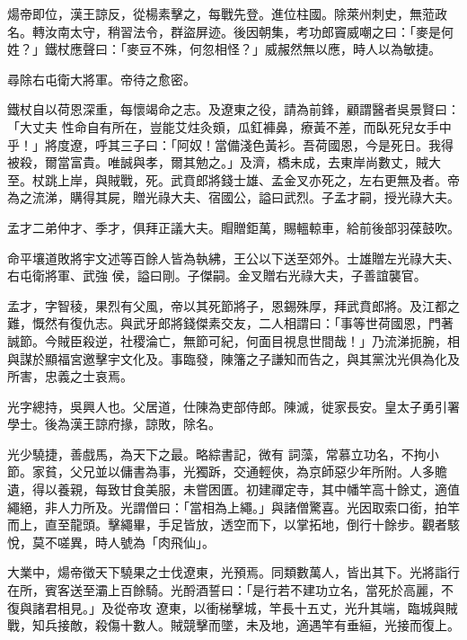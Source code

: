 \begin{pinyinscope}
 煬帝即位，漢王諒反，從楊素擊之，每戰先登。進位柱國。除萊州刺史，無蒞政名。轉汝南太守，稍習法令，群盜屏迹。後因朝集，考功郎竇威嘲之曰：「麥是何姓？」鐵杖應聲曰：「麥豆不殊，何忽相怪？」威赧然無以應，時人以為敏捷。



 尋除右屯衛大將軍。帝待之愈密。



 鐵杖自以荷恩深重，每懷竭命之志。及遼東之役，請為前鋒，顧謂醫者吳景賢曰：「大丈夫
 性命自有所在，豈能艾炷灸頞，瓜釭褲鼻，療黃不差，而臥死兒女手中乎！」將度遼，呼其三子曰：「阿奴！當備淺色黃衫。吾荷國恩，今是死日。我得被殺，爾當富貴。唯誠與孝，爾其勉之。」及濟，橋未成，去東岸尚數丈，賊大至。杖跳上岸，與賊戰，死。武賁郎將錢士雄、孟金叉亦死之，左右更無及者。帝為之流涕，購得其屍，贈光祿大夫、宿國公，謚曰武烈。子孟才嗣，授光祿大夫。



 孟才二弟仲才、季才，俱拜正議大夫。賵贈鉅萬，賜轀輬車，給前後部羽葆鼓吹。



 命平壤道敗將宇文述等百餘人皆為執紼，王公以下送至郊外。士雄贈左光祿大夫、右屯衛將軍、武強
 侯，謚曰剛。子傑嗣。金叉贈右光祿大夫，子善誼襲官。



 孟才，字智稜，果烈有父風，帝以其死節將子，恩錫殊厚，拜武賁郎將。及江都之難，慨然有復仇志。與武牙郎將錢傑素交友，二人相謂曰：「事等世荷國恩，門著誠節。今賊臣殺逆，社稷淪亡，無節可紀，何面目視息世間哉！」乃流涕扼腕，相與謀於顯福宮邀擊宇文化及。事臨發，陳籓之子謙知而告之，與其黨沈光俱為化及所害，忠義之士哀焉。



 光字總持，吳興人也。父居道，仕陳為吏部侍郎。陳滅，徙家長安。皇太子勇引署學士。後為漢王諒府掾，諒敗，除名。



 光少驍捷，善戲馬，為天下之最。略綜書記，微有
 詞藻，常慕立功名，不拘小節。家貧，父兄並以傭書為事，光獨跅，交通輕俠，為京師惡少年所附。人多贍遺，得以養親，每致甘食美服，未嘗困匱。初建禪定寺，其中幡竿高十餘丈，適值繩絕，非人力所及。光謂僧曰：「當相為上繩。」與諸僧驚喜。光因取索口銜，拍竿而上，直至龍頭。擊繩畢，手足皆放，透空而下，以掌拓地，倒行十餘步。觀者駭悅，莫不嗟異，時人號為「肉飛仙」。



 大業中，煬帝徵天下驍果之士伐遼東，光預焉。同類數萬人，皆出其下。光將詣行在所，賓客送至灞上百餘騎。光酹酒誓曰：「是行若不建功立名，當死於高麗，不復與諸君相見。」及從帝攻
 遼東，以衝梯擊城，竿長十五丈，光升其端，臨城與賊戰，知兵接敵，殺傷十數人。賊競擊而墜，未及地，適遇竿有垂絙，光接而復上。




\end{pinyinscope}
